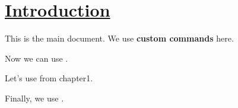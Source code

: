 \documentclass{article}
\newcommand{\mycommand}[1]{{\bf #1}}
\newcommand{\customsection}[1]{\section*{\underline{#1}}}
\begin{document}
\customsection{Introduction}
This is the main document. We use \mycommand{custom commands} here.



Now we can use .



Let's use  from chapter1.



Finally, we use .
\end{document}
